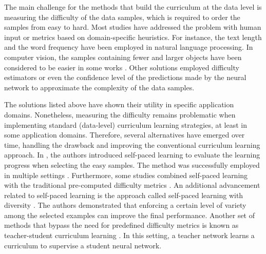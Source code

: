 \documentclass[10pt,twocolumn,letterpaper]{article}
\begin{document}
The main challenge for the methods that build the curriculum at the data level is measuring the difficulty of the data samples, which is required to order the samples from easy to hard. Most studies have addressed the problem with human input \cite{Pentina-CVPR-2015, Sanchez-MICCAI-2019,Wei-WACV-2021} or metrics based on domain-specific heuristics. For instance, the text length \cite{Kocmi-RANLP-2017, Cirik-Arxiv-2016,Tay-ACL-2019,Zhang-ISPASS-2021} and the word frequency \cite{Bengio-ICML-2009, Liu-IJCAI-2018} have been employed in natural language processing. In computer vision, the samples containing fewer and larger objects have been considered to be easier in some works \cite{Soviany-CVIU-2021, Shi-ECCV-2016}. Other solutions employed difficulty estimators \cite{Ionescu-CVPR-2016} or even the confidence level of the predictions made by the neural network \cite{Gong-TIP-2016, Hacohen-Arxiv-2019} to approximate the complexity of the data samples.

The solutions listed above have shown their utility in specific application domains. Nonetheless, measuring the difficulty remains problematic when implementing standard (data-level) curriculum learning strategies, at least in some application domains. Therefore, several alternatives have emerged over time, handling the drawback and improving the conventional curriculum learning approach. In \cite{Kumar-ANIPS-2010}, the authors introduced self-paced learning to evaluate the learning progress when selecting the easy samples. The method was successfully employed in multiple settings \cite{Kumar-ANIPS-2010, Gong-TEVC-2019, Fan-AAAI-2017, Li-AAAI-2016, Jhou-PR-2018, Jiang-AAAI-2015, Ristea-INTERSPEECH-2021}. Furthermore, some studies combined self-paced learning with the traditional pre-computed difficulty metrics \cite{Jiang-AAAI-2015, Ma-ICML-2017}. An additional advancement related to self-paced learning is the approach called self-paced learning with diversity \cite{Jiang-NIPS-2014}. The authors demonstrated that enforcing a certain level of variety among the selected examples can improve the final performance. Another set of methods that bypass the need for predefined difficulty metrics is known as teacher-student curriculum learning \cite{Zhang-AS-2019, Wu-NIPS-2018}. In this setting, a teacher network learns a curriculum to supervise a student neural network.
\end{document}
